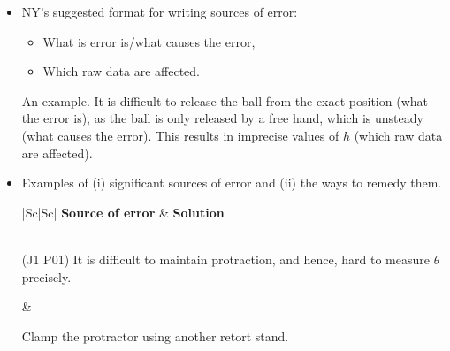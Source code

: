 \documentclass[oneside]{book}
\begin{document}
\begin{itemize}
    \item NY's suggested format for writing sources of error:
    \begin{itemize}
        \item What is error is/what causes the error, 
        \item Which raw data are affected.
    \end{itemize}
    An example. It is difficult to release the ball from the exact position (what the error is), as the ball is only released by a free hand, which is unsteady (what causes the error). This results in imprecise values of \(h\) (which raw data are affected).
    \item Examples of (i) significant sources of error and (ii) the ways to remedy them.
    \begin{longtable}{|Sc|Sc|}
        \hline
        \textbf{Source of error} & \textbf{Solution}\\
        \hline
        \hline
        \\
        \hline
        \begin{minipage}{0.5\textwidth-25.2pt}
            (J1 P01) It is difficult to maintain protraction, and hence, hard to measure \(\theta\) precisely.
        \end{minipage}&
        \begin{minipage}{0.5\textwidth-25.2pt}
            Clamp the protractor using another retort stand.    
        \end{minipage}\\

\end{longtable}
\end{itemize}
\end{document}

